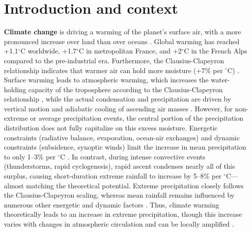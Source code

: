 \documentclass[hess, manuscript]{copernicus}
\begin{document}

\section{Introduction and context}\label{introduction-and-context}

\textbf{Climate change} is driving a warming of the planet's surface
air, with a more pronounced increase over land than over oceans  \citep{IPCC2021}. Global warming has reached +1.1$^\circ$C worldwide, +1.7$^\circ$C in
metropolitan France, and +2$^\circ$C in the French Alps compared to the
pre-industrial era. Furthermore, the Clausius-Clapeyron relationship
indicates that warmer air can hold more moisture (+7\% per $^\circ$C)
\citep{clapeyron1834}. Surface warming leads to atmospheric warming, which increases the water-holding capacity of the troposphere according to the Clausius-Clapeyron relationship \citep{clapeyron1834, trenberth2003, westra2013}, while the actual condensation and precipitation are driven by vertical motion and adiabatic cooling of ascending air masses \citep{ogorman2010}.
However, for non-extreme or average precipitation events, the central portion of the precipitation
distribution does not fully capitalize on this excess moisture.
Energetic constraints (radiative balance, evaporation, ocean-air
exchanges) and dynamic constraints (subsidence, synoptic winds) limit
the increase in mean precipitation to only 1--3\% per $^\circ$C \citep{IPCC2021}. In
contrast, during intense convective events (thunderstorms, rapid
cyclogenesis), rapid ascent condenses nearly all of this surplus,
causing short-duration extreme rainfall to increase by 5--8\% per
$^\circ$C---almost matching the theoretical potential. Extreme precipitation
closely follows the Clausius-Clapeyron scaling, whereas mean rainfall
remains influenced by numerous other energetic and dynamic factors
\citep{ogorman2015contrasting}. Thus, climate warming theoretically leads to an
increase in extreme precipitation, though this increase varies with
changes in atmospheric circulation and can be locally amplified \citep{blanchet2021explaining}.
\end{document}
